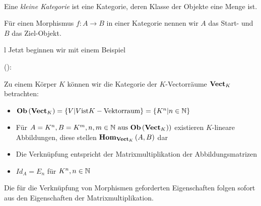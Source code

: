 \documentclass{article}
\renewcommand{\id}{\ensuremath{Id}}
\begin{document}
		\begin{defi} \cite[Definition 2.2.29]{Bra} \\
		Eine \emph{kleine Kategorie} ist eine Kategorie, deren Klasse der Objekte eine Menge ist.
		\end{defi}
		\begin{defi}  \cite[Bemerkung 2.2.25]{Bra}
		F\"ur einen Morphismus \( f: A \to B \) in einer Kategorie \CatC nennen wir \( A \) das Start- und \( B \) das Ziel-Objekt.
		\end{defi}
		
l		Jetzt beginnen wir mit einem Beispiel

		\begin{bsp}
		
	(\cite[Beispiel 2.2.10]{Bra}):
		
		Zu einem K\"orper \( K \) k\"onnen wir die Kategorie der \( K\)-Vectorr\"aume \( \mathbf{Vect}_K \) betrachten:
		\begin{itemize}
			\item	\(  \mathbf{Ob}  \left( \mathbf{Vect}_K \right) = \left\lbrace V | V \text{ist} K-\text{Vektorraum} \right\rbrace  = \left\lbrace K^n | n \in \mathbb{N} \right\rbrace \)
			\item F\"ur  \( A=K^n , B =K^m , n,m \in \BN \ \text{aus} \ \Ob \left( \CatVect_K) \right) \) existieren $K$-lineare Abbildungen, diese stellen \(  \mathbf{Hom } _{\mathbf{Vect}_K}\left( A,B \right) \) dar
			\item Die Verkn\"upfung entspricht der Matrixmultiplikation der Abbildungsmatrizen 
			\item \( \id_A = E_n \) f\"ur \( K^n , n \in \mathbb{N} \)
		 \end{itemize}
		 Die f\"ur die Verkn\"upfung von Morphismen geforderten Eigenschaften folgen sofort aus den Eigenschaften der Matrixmultiplikation.
		 \end{bsp}
		 	 
\end{document}
